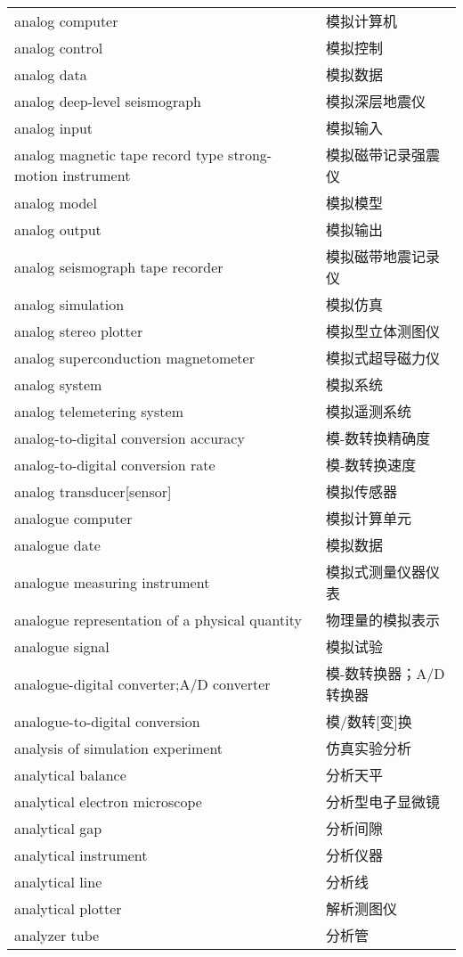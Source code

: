 \documentclass[
]{article}
\begin{document}
\begin{longtable}[]{@{}ll@{}}
analog computer & 模拟计算机 \\
analog control & 模拟控制 \\
analog data & 模拟数据 \\
analog deep-level seismograph & 模拟深层地震仪 \\
analog input & 模拟输入 \\
analog magnetic tape record type strong-motion instrument &
模拟磁带记录强震仪 \\
analog model & 模拟模型 \\
analog output & 模拟输出 \\
analog seismograph tape recorder & 模拟磁带地震记录仪 \\
analog simulation & 模拟仿真 \\
analog stereo plotter & 模拟型立体测图仪 \\
analog superconduction magnetometer & 模拟式超导磁力仪 \\
analog system & 模拟系统 \\
analog telemetering system & 模拟遥测系统 \\
analog-to-digital conversion accuracy & 模-数转换精确度 \\
analog-to-digital conversion rate & 模-数转换速度 \\
analog transducer{[}sensor{]} & 模拟传感器 \\
analogue computer & 模拟计算单元 \\
analogue date & 模拟数据 \\
analogue measuring instrument & 模拟式测量仪器仪表 \\
analogue representation of a physical quantity & 物理量的模拟表示 \\
analogue signal & 模拟试验 \\
analogue-digital converter;A/D converter & 模-数转换器；A/D转换器 \\
analogue-to-digital conversion & 模/数转{[}变{]}换 \\
analysis of simulation experiment & 仿真实验分析 \\
analytical balance & 分析天平 \\
analytical electron microscope & 分析型电子显微镜 \\
analytical gap & 分析间隙 \\
analytical instrument & 分析仪器 \\
analytical line & 分析线 \\
analytical plotter & 解析测图仪 \\
analyzer tube & 分析管 \\

\end{longtable}
\end{document}
